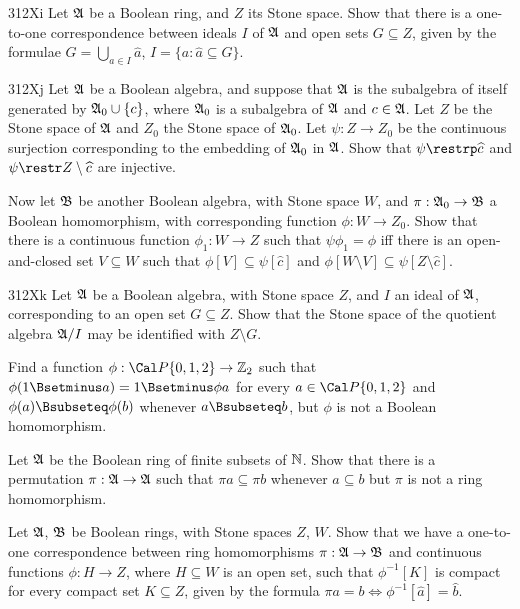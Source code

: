 {\spheader 312Xi Let $\frak A$ be a Boolean ring, and $Z$ its Stone
space.   Show that there is a one-to-one correspondence between ideals
$I$ of $\frak A$ and open sets $G\subseteq Z$, given by the formulae
$G=\bigcup_{a\in I}\widehat a$, $I=\{a:\widehat a\subseteq G\}$.

\spheader 312Xj Let $\frak A$ be a Boolean algebra, and suppose that
$\frak A$ is the subalgebra of itself generated by $\frak A_0\cup\{c\}$,
where $\frak A_0$ is a subalgebra of $\frak A$ and $c\in\frak A$.   Let
$Z$ be the Stone space of $\frak A$ and $Z_0$ the Stone space of
$\frak A_0$.   Let $\psi:Z\to Z_0$ be the continuous surjection
corresponding to the embedding of $\frak A_0$ in $\frak A$.   Show that
$\psi\restrp\widehat c$ and $\psi\restr Z\setminus\widehat c$
are injective.

Now let $\frak B$ be another Boolean algebra, with Stone space $W$, and
$\pi:\frak A_0\to\frak B$ a Boolean homomorphism, with corresponding
function $\phi:W\to Z_0$.   Show that there is a continuous function
$\phi_1:W\to Z$ such that $\psi\phi_1=\phi$ iff there is an
open-and-closed set $V\subseteq W$ such that
$\phi[V]\subseteq\psi[\widehat c]$ and
$\phi[W\setminus V]\subseteq\psi[Z\setminus\widehat c]$.

\spheader 312Xk Let $\frak A$ be a Boolean algebra, with Stone space
$Z$, and $I$ an ideal of $\frak A$, corresponding to an open set
$G\subseteq Z$.   Show that the Stone space of the quotient algebra
$\frak A/I$ may be identified with $Z\setminus G$.

Find a function $\phi:\Cal P\{0,1,2\}\to\Bbb Z_2$ such that
$\phi(1\Bsetminus a)=1\Bsetminus\phi a$
for every $a\in\Cal P\{0,1,2\}$ and $\phi(a)\Bsubseteq\phi(b)$ whenever
$a\Bsubseteq b$, but $\phi$ is not a Boolean homomorphism.

 Let $\frak A$ be the Boolean ring of finite
subsets of $\Bbb N$.   Show that there is a permutation
$\pi:\frak A\to\frak A$ such that $\pi a\subseteq \pi b$ whenever
$a\subseteq b$ but $\pi$ is not a ring homomorphism.

 Let $\frak A$, $\frak B$ be Boolean rings, with
Stone spaces $Z$, $W$.   Show that we have a
one-to-one correspondence between ring homomorphisms
$\pi:\frak A\to\frak B$ and continuous functions $\phi:H\to Z$, where
$H\subseteq W$ is an open set, such that
$\phi^{-1}[K]$ is compact for every compact set $K\subseteq Z$, given by
the formula $\pi a=b\iff\phi^{-1}[\widehat a]=\widehat b$.

}
